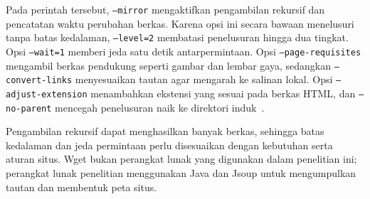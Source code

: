 Pada perintah tersebut, \texttt{--mirror} mengaktifkan pengambilan rekursif dan pencatatan waktu perubahan berkas. Karena opsi ini secara bawaan menelusuri tanpa batas kedalaman, \texttt{--level=2} membatasi penelusuran hingga dua tingkat. Opsi \texttt{--wait=1} memberi jeda satu detik antarpermintaan. Opsi \texttt{--page-requisites} mengambil berkas pendukung seperti gambar dan lembar gaya, sedangkan \texttt{--convert-links} menyesuaikan tautan agar mengarah ke salinan lokal. Opsi \texttt{--adjust-extension} menambahkan ekstensi yang sesuai pada berkas HTML, dan \texttt{--no-parent} mencegah penelusuran naik ke direktori induk~\cite{gnu:24:wget}.

Pengambilan rekursif dapat menghasilkan banyak berkas, sehingga batas kedalaman dan jeda permintaan perlu disesuaikan dengan kebutuhan serta aturan situs. Wget bukan perangkat lunak yang digunakan dalam penelitian ini; perangkat lunak penelitian menggunakan Java dan Jsoup untuk mengumpulkan tautan dan membentuk peta situs.





		
			

